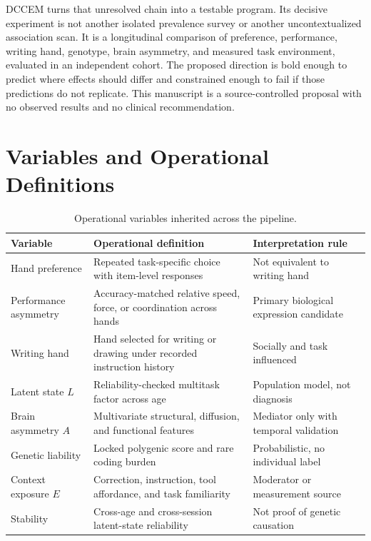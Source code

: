 \documentclass[10pt,conference]{IEEEtran}
\begin{document}
DCCEM turns that unresolved chain into a testable program. Its decisive experiment is not another isolated prevalence survey or another uncontextualized association scan. It is a longitudinal comparison of preference, performance, writing hand, genotype, brain asymmetry, and measured task environment, evaluated in an independent cohort. The proposed direction is bold enough to predict where effects should differ and constrained enough to fail if those predictions do not replicate. This manuscript is a source-controlled proposal with no observed results and no clinical recommendation.

\appendices
\section{Variables and Operational Definitions}
\begin{table}[h]
\caption{Operational variables inherited across the pipeline.}
\centering
\small
\begin{tabularx}{\columnwidth}{@{}p{}YY@{}}
\toprule
Variable & Operational definition & Interpretation rule \\
\midrule
Hand preference & Repeated task-specific choice with item-level responses & Not equivalent to writing hand \\
Performance asymmetry & Accuracy-matched relative speed, force, or coordination across hands & Primary biological expression candidate \\
Writing hand & Hand selected for writing or drawing under recorded instruction history & Socially and task influenced \\
Latent state $L$ & Reliability-checked multitask factor across age & Population model, not diagnosis \\
Brain asymmetry $A$ & Multivariate structural, diffusion, and functional features & Mediator only with temporal validation \\
Genetic liability & Locked polygenic score and rare coding burden & Probabilistic, no individual label \\
Context exposure $E$ & Correction, instruction, tool affordance, and task familiarity & Moderator or measurement source \\
Stability & Cross-age and cross-session latent-state reliability & Not proof of genetic causation \\
\bottomrule
\end{tabularx}
\end{table}
\end{document}
